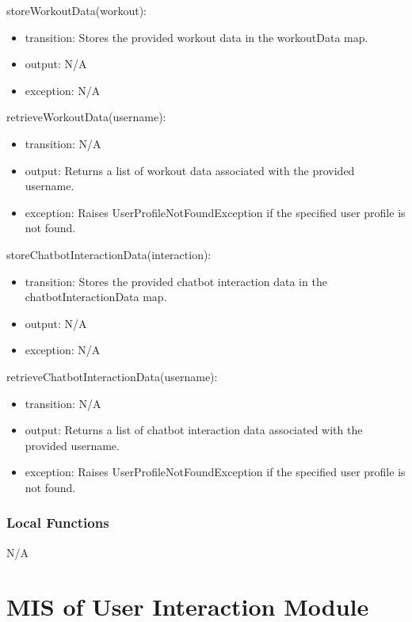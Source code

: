 \documentclass[12pt, titlepage]{article}
\begin{document}
\noindent storeWorkoutData(workout):
\begin{itemize}
\item transition: Stores the provided workout data in the workoutData map.
\item output: N/A
\item exception: N/A
\end{itemize}

\noindent retrieveWorkoutData(username):
\begin{itemize}
\item transition: N/A
\item output: Returns a list of workout data associated with the provided username.
\item exception: Raises UserProfileNotFoundException if the specified user profile is not found.
\end{itemize}

\noindent storeChatbotInteractionData(interaction):
\begin{itemize}
\item transition: Stores the provided chatbot interaction data in the chatbotInteractionData map.
\item output: N/A
\item exception: N/A
\end{itemize}

\noindent retrieveChatbotInteractionData(username):
\begin{itemize}
\item transition: N/A
\item output: Returns a list of chatbot interaction data associated with the provided username.
\item exception: Raises UserProfileNotFoundException if the specified user profile is not found.
\end{itemize}


\subsubsection{Local Functions}
N/A

\section{MIS of User Interaction Module}


\end{document}
